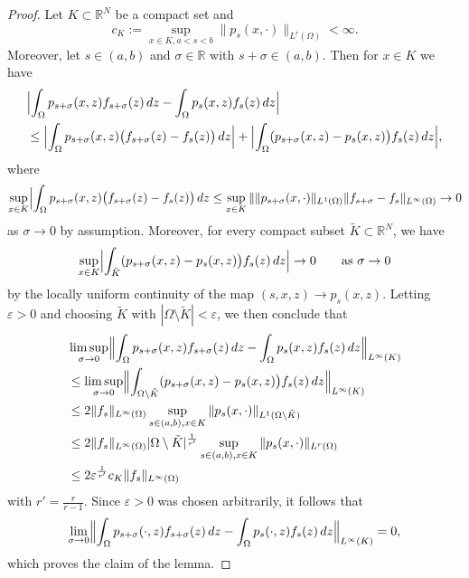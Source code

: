 \documentclass[notitlepage,11pt,reqno]{amsart}
\theoremstyle{definition}
\numberwithin{equation}{section}
\newcommand{\eps}{{\varepsilon}}
\newcommand{\R}{\mathds{R}}
\begin{document}
\begin{proof}
  Let $K \subset \R^N$ be a compact set and
  $$
  c_K:= \sup_{x \in K, a<s<b} \|p_s(x,\cdot)\|_{L^r(\Omega)}< \infty.
  $$
  Moreover, let $s \in (a,b)$ and $\sigma \in \R$ with $s+ \sigma \in (a,b)$. Then for $x \in K$ we have
  \begin{align*}
    &\Bigl|\int_{\Omega} p_{s+\sigma}(x,z)f_{s+\sigma}(z)\,dz -\int_{\Omega} p_s(x,z)f_s(z)\,dz \Bigr|\\
    &\le \Bigl|\int_{\Omega} p_{s+\sigma}(x,z)\bigl(f_{s+\sigma}(z)-f_s(z)\bigr)\,dz\Bigr|+ \Bigl|\int_{\Omega} (p_{s+\sigma}(x,z)-p_s(x,z)\bigr)f_s(z)\,dz \Bigr|, 
   \end{align*}
   where
   $$
   \sup_{x \in K} \Bigl|\int_{\Omega} p_{s+\sigma}(x,z)\bigl(f_{s+\sigma}(z)-f_s(z)\bigr)\,dz
   \le \sup_{x \in K} \|\|p_{s+\sigma}(x,\cdot)\|_{L^1(\Omega)} \|f_{s+\sigma}-f_s\|_{L^\infty(\Omega)} \to 0
   $$
   as $\sigma \to 0$ by assumption. Moreover, for every compact subset $\tilde K \subset \R^N$, we have
   $$
   \sup_{x \in K} \Bigl|\int_{\tilde K} (p_{s+\sigma}(x,z)-p_s(x,z)\bigr)f_s(z)\,dz \Bigr| \to 0 \qquad \text{as $\sigma \to 0$}
   $$
   by the locally uniform continuity of the map $(s,x,z) \to p_s(x,z)$. 
   Letting $\eps>0$ and choosing $\tilde K$ with $|\Omega \setminus \tilde K|<\eps$, we then conclude that
   \begin{align*}
   &\limsup_{\sigma \to 0} \Bigl\|\int_{\Omega} p_{s+\sigma}(x,z)f_{s+\sigma}(z)\,dz -\int_{\Omega} p_s(x,z)f_s(z)\,dz \Bigr\|_{L^\infty(K)}\\
     &\le \limsup_{\sigma \to 0}\Bigl\|\int_{\Omega \setminus \tilde K} (p_{s+\sigma}(x,z)-p_s(x,z)\bigr)f_s(z)\,dz \Bigr \|_{L^\infty(K)} \\
     &\le 2 \|f_s\|_{L^\infty(\Omega)} \sup_{s \in (a,b), x \in K}\|p_s(x,\cdot)\|_{L^1(\Omega \setminus \tilde K)}\\ 
     &\le 2 \|f_s\|_{L^\infty(\Omega)}|\Omega \setminus \tilde K|^{\frac{1}{r'}} \sup_{s \in (a,b), x \in K}\|p_s(x,\cdot)\|_{L^r(\Omega)}\\ 
     &\le 2 \eps^{\frac{1}{r'}} c_K \|f_s\|_{L^\infty(\Omega)} 
   \end{align*}
with $r' = \frac{r}{r-1}$. Since $\eps>0$ was chosen arbitrarily, it follows that 
$$
\lim_{\sigma \to 0} \Bigl\|\int_{\Omega} p_{s+\sigma}(\cdot,z)f_{s+\sigma}(z)\,dz -\int_{\Omega} p_s(\cdot,z)f_s(z)\,dz \Bigr\|_{L^\infty(K)}= 0,
$$
which proves the claim of the lemma.  
\end{proof}
\end{document}

